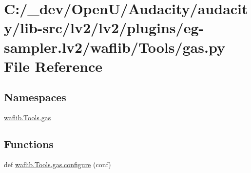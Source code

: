 \hypertarget{lv2_2plugins_2eg-sampler_8lv2_2waflib_2_tools_2gas_8py}{}\section{C\+:/\+\_\+dev/\+Open\+U/\+Audacity/audacity/lib-\/src/lv2/lv2/plugins/eg-\/sampler.lv2/waflib/\+Tools/gas.py File Reference}
\label{lv2_2plugins_2eg-sampler_8lv2_2waflib_2_tools_2gas_8py}
\subsection*{Namespaces}
\begin{DoxyCompactItemize}
\item 
 \hyperlink{namespacewaflib_1_1_tools_1_1gas}{waflib.\+Tools.\+gas}
\end{DoxyCompactItemize}
\subsection*{Functions}
\begin{DoxyCompactItemize}
\item 
def \hyperlink{namespacewaflib_1_1_tools_1_1gas_ad1cc79a9a3edafdd0c92e0198ba5f802}{waflib.\+Tools.\+gas.\+configure} (conf)
\end{DoxyCompactItemize}
